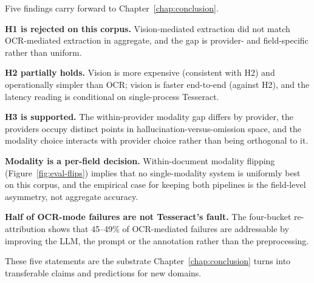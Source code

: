Five findings carry forward to Chapter~\ref{chap:conclusion}.

\textbf{H1 is rejected on this corpus.} Vision-mediated extraction
did not match OCR-mediated extraction in aggregate, and the gap is
provider- and field-specific rather than uniform.

\textbf{H2 partially holds.} Vision is more expensive (consistent
with H2) and operationally simpler than OCR; vision is faster
end-to-end (against H2), and the latency reading is conditional on
single-process Tesseract.

\textbf{H3 is supported.} The within-provider modality gap differs
by provider, the providers occupy distinct points in
hallucination-versus-omission space, and the modality choice
interacts with provider choice rather than being orthogonal to it.

\textbf{Modality is a per-field decision.} Within-document modality
flipping (Figure~\ref{fig:eval-flips}) implies that no
single-modality system is uniformly best on this corpus, and the
empirical case for keeping both pipelines is the field-level
asymmetry, not aggregate accuracy.

\textbf{Half of OCR-mode failures are not Tesseract's fault.} The
four-bucket re-attribution shows that 45--49\% of OCR-mediated
failures are addressable by improving the LLM, the prompt or the
annotation rather than the preprocessing.

These five statements are the substrate Chapter~\ref{chap:conclusion}
turns into transferable claims and predictions for new domains.
